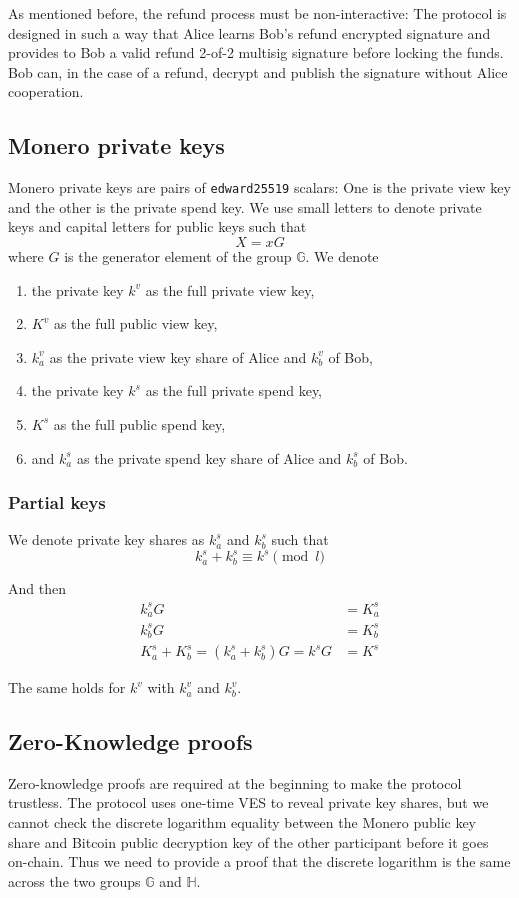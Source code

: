 \documentclass{llncs}
\newcommand{\GG}{\mathbb{G}}
\newcommand{\HH}{\mathbb{H}}
\begin{document}
As mentioned before, the refund process must be non-interactive: The protocol is designed in such a way that Alice learns Bob's refund encrypted signature and provides to Bob a valid refund 2-of-2 multisig signature before locking the funds. Bob can, in the case of a refund, decrypt and publish the signature without Alice cooperation.

\subsection{Monero private keys}
Monero private keys are pairs of \texttt{edward25519} scalars: One is the private view key and the other is the private spend key. We use small letters to denote private keys and capital letters for public keys such that
$$X = xG$$
where $G$ is the generator element of the group $\GG$. We denote
\begin{enumerate}[label=(\roman*)]
    \item the private key $k^v$ as the full private view key,
    \item $K^v$ as the full public view key,
    \item $k^v_a$ as the private view key share of Alice and $k^v_b$ of Bob,
    \item the private key $k^s$ as the full private spend key,
    \item $K^s$ as the full public spend key,
    \item and $k^s_a$ as the private spend key share of Alice and $k^s_b$ of Bob.
\end{enumerate}

\subsubsection{Partial keys}
We denote private key shares as $k^s_a$ and $k^s_b$ such that
$$k^s_a + k^s_b \equiv k^s \pmod l$$

And then
\begin{equation}
\begin{split}
    k^s_aG &= K^s_a \\
    k^s_bG &= K^s_b \\
    K^s_a + K^s_b = (k^s_a + k^s_b)G = k^sG &= K^s
\end{split}
\end{equation}

The same holds for $k^v$ with $k^v_a$ and $k^v_b$.

\subsection{Zero-Knowledge proofs}
\label{eqDiscreteLog}
Zero-knowledge proofs are required at the beginning to make the protocol trustless. The protocol uses one-time VES to reveal private key shares, but we cannot check the discrete logarithm equality between the Monero public key share and Bitcoin public decryption key of the other participant before it goes on-chain. Thus we need to provide a proof that the discrete logarithm is the same across the two groups $\GG$ and $\HH$.
\end{document}
